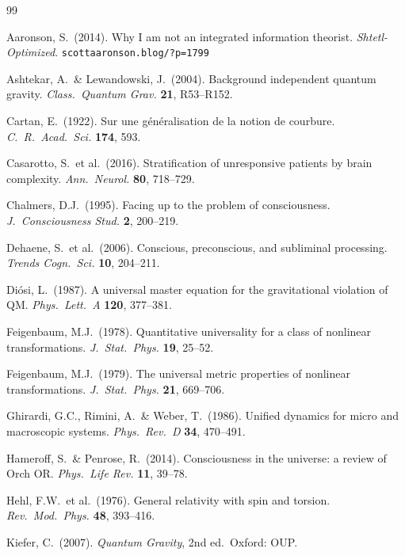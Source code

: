 \documentclass[12pt,a4paper]{article}
\numberwithin{equation}{section}
\begin{document}
\newpage
\begin{thebibliography}{99}

Aaronson, S.\ (2014). Why I am not an integrated information theorist.
\textit{Shtetl-Optimized}. \texttt{scottaaronson.blog/?p=1799}

Ashtekar, A.\ \& Lewandowski, J.\ (2004). Background independent quantum gravity.
\textit{Class.\ Quantum Grav.} \textbf{21}, R53--R152.

Cartan, E.\ (1922). Sur une g\'en\'eralisation de la notion de courbure.
\textit{C.\ R.\ Acad.\ Sci.} \textbf{174}, 593.

Casarotto, S.\ et al.\ (2016). Stratification of unresponsive patients by brain complexity.
\textit{Ann.\ Neurol.} \textbf{80}, 718--729.

Chalmers, D.J.\ (1995). Facing up to the problem of consciousness.
\textit{J.\ Consciousness Stud.} \textbf{2}, 200--219.

Dehaene, S.\ et al.\ (2006). Conscious, preconscious, and subliminal processing.
\textit{Trends Cogn.\ Sci.} \textbf{10}, 204--211.

Di\'osi, L.\ (1987). A universal master equation for the gravitational violation of QM.
\textit{Phys.\ Lett.\ A} \textbf{120}, 377--381.

Feigenbaum, M.J.\ (1978). Quantitative universality for a class of nonlinear transformations.
\textit{J.\ Stat.\ Phys.} \textbf{19}, 25--52.

Feigenbaum, M.J.\ (1979). The universal metric properties of nonlinear transformations.
\textit{J.\ Stat.\ Phys.} \textbf{21}, 669--706.

Ghirardi, G.C., Rimini, A.\ \& Weber, T.\ (1986). Unified dynamics for micro and macroscopic systems.
\textit{Phys.\ Rev.\ D} \textbf{34}, 470--491.

Hameroff, S.\ \& Penrose, R.\ (2014). Consciousness in the universe: a review of Orch OR.
\textit{Phys.\ Life Rev.} \textbf{11}, 39--78.

Hehl, F.W.\ et al.\ (1976). General relativity with spin and torsion.
\textit{Rev.\ Mod.\ Phys.} \textbf{48}, 393--416.

Kiefer, C.\ (2007). \textit{Quantum Gravity}, 2nd ed.\ Oxford: OUP.


\end{thebibliography}
\end{document}

